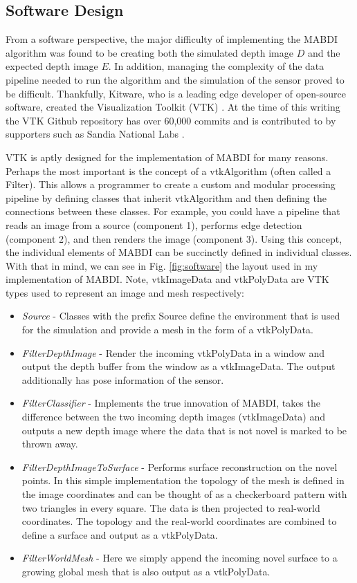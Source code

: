 \subsection{Software Design}

From a software perspective, the major difficulty of implementing the MABDI
algorithm was found to be creating both the simulated depth image $D$ and the
expected depth image $E$. In addition, managing the complexity of the data
pipeline needed to run the algorithm and the simulation of the sensor proved to
be difficult. Thankfully, Kitware, who is a leading edge developer of
open-source software, created the Visualization Toolkit (VTK)
\cite{schroeder2004visualization, sitevtk}. At the time of this writing the VTK
Github repository has over 60,000 commits and is contributed to by supporters
such as Sandia National Labs \cite{sitesandia}.

VTK is aptly designed for the implementation of MABDI for many reasons. Perhaps
the most important is the concept of a vtkAlgorithm (often called a Filter).
This allows a programmer to create a custom and modular processing pipeline by
defining classes that inherit vtkAlgorithm and then defining the connections
between these classes. For example, you could have a pipeline that reads an
image from a source (component 1), performs edge detection (component 2), and
then renders the image (component 3). Using this concept, the individual
elements of MABDI can be succinctly defined in individual classes. With that in
mind, we can see in Fig. \ref{fig:software} the layout used in my implementation
of MABDI. Note, vtkImageData and vtkPolyData are VTK types used to represent an
image and mesh respectively:

\begin{itemize}
    \item  \textit{Source} - Classes with the prefix Source define the
    environment that is used for the simulation and provide a mesh in the form
    of a vtkPolyData.
    \item \textit{FilterDepthImage} - Render the incoming vtkPolyData in a
    window and output the depth buffer from the window as a vtkImageData. The
    output additionally has pose information of the sensor.
    \item \textit{FilterClassifier} - Implements the true innovation of MABDI,
    takes the difference between the two incoming depth images (vtkImageData)
    and outputs a new depth image where the data that is not novel is marked to
    be thrown away.
    \item \textit{FilterDepthImageToSurface} - Performs surface reconstruction
    on the novel points. In this simple implementation the topology of the mesh
    is defined in the image coordinates and can be thought of as a checkerboard
    pattern with two triangles in every square. The data is then projected to
    real-world coordinates. The topology and the real-world coordinates are
    combined to define a surface and output as a vtkPolyData.
    \item \textit{FilterWorldMesh} - Here we simply append the incoming novel
    surface to a growing global mesh that is also output as a vtkPolyData.
\end{itemize}

